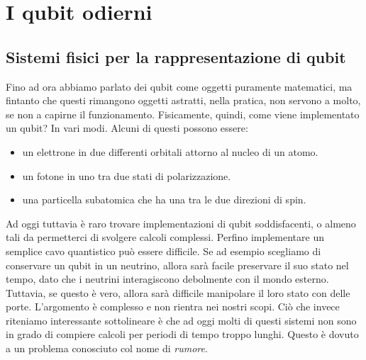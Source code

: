 \documentclass{book}
\theoremstyle{definition}
\theoremstyle{definition}
\theoremstyle{definition}
\theoremstyle{plain}
\theoremstyle{plain}
\theoremstyle{plain}
\theoremstyle{plain}
\begin{document}
\section{I qubit odierni}
\subsection{Sistemi fisici per la rappresentazione di qubit}
Fino ad ora abbiamo parlato dei qubit come oggetti puramente matematici, ma fintanto che questi rimangono oggetti astratti, nella pratica, non servono a molto, se non a capirne il funzionamento. Fisicamente, quindi, come viene implementato un qubit? In vari modi. Alcuni di questi possono essere:
\begin{itemize}
    \item un elettrone in due differenti orbitali attorno al nucleo di un atomo.
    \item un fotone in uno tra due stati di polarizzazione.
    \item una particella subatomica che ha una tra le due direzioni di spin.
\end{itemize}
Ad oggi tuttavia è raro trovare implementazioni di qubit soddisfacenti, o almeno tali da permetterci di svolgere calcoli complessi. Perfino implementare un semplice cavo quantistico può essere difficile. Se ad esempio scegliamo di conservare un qubit in un neutrino, allora sarà facile preservare il suo stato nel tempo, dato che i neutrini interagiscono debolmente con il mondo esterno. Tuttavia, se questo è vero, allora sarà difficile manipolare il loro stato con delle porte. L'argomento è complesso e non rientra nei nostri scopi. Ciò che invece riteniamo interessante sottolineare è che ad oggi molti di questi sistemi non sono in grado di compiere calcoli per periodi di tempo troppo lunghi. Questo è dovuto a un problema conosciuto col nome di \emph{rumore}.
\end{document}
